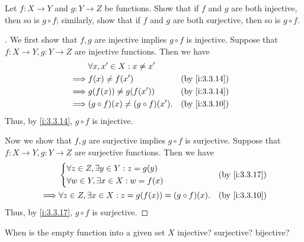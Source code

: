 \begin{ex}\label{i:ex:3.3.2}
  Let \(f : X \to Y\) and \(g : Y \to Z\) be functions.
  Show that if \(f\) and \(g\) are both injective, then so is \(g \circ f\);
  similarly, show that if \(f\) and \(g\) are both surjective, then so is \(g \circ f\).
\end{ex}

\begin{proof}[]
  We first show that \(f, g\) are injective implies \(g \circ f\) is injective.
  Suppose that \(f : X \to Y, g : Y \to Z\) are injective functions.
  Then we have
  \begin{align*}
             & \forall x, x' \in X : x \neq x'                         \\
    \implies & f(x) \neq f(x')                      &  & \by{i:3.3.14} \\
    \implies & g(f(x)) \neq g(f(x'))                &  & \by{i:3.3.14} \\
    \implies & (g \circ f)(x) \neq (g \circ f)(x'). &  & \by{i:3.3.10}
  \end{align*}
  Thus, by \cref{i:3.3.14}, \(g \circ f\) is injective.

  Now we show that \(f, g\) are surjective implies \(g \circ f\) is surjective.
  Suppose that \(f : X \to Y, g : Y \to Z\) are surjective functions.
  Then we have
  \begin{align*}
             & \begin{dcases}
                 \forall z \in Z, \exists y \in Y : z = g(y) \\
                 \forall w \in Y, \exists x \in X : w = f(x)
               \end{dcases}                   &  & \by{i:3.3.17}                                   \\
    \implies & \forall z \in Z, \exists x \in X : z = g(f(x)) = (g \circ f)(x). &  & \by{i:3.3.10}
  \end{align*}
  Thus, by \cref{i:3.3.17}, \(g \circ f\) is surjective.
\end{proof}

\begin{ex}\label{i:ex:3.3.3}
  When is the empty function into a given set \(X\) injective?
  surjective?
  bijective?
\end{ex}


